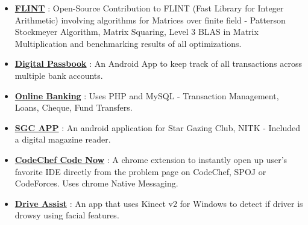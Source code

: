 \documentclass[margin, centered]{res}
\begin{document}
\begin{resume}
\begin{itemize}[leftmargin=*]
 \item \textbf{\href{https://github.com/ashish1294/flint2}{FLINT}} : Open-Source Contribution to FLINT (Fast Library for Integer Arithmetic) involving algorithms for Matrices over finite field - Patterson Stockmeyer Algorithm, Matrix Squaring, Level 3 BLAS in Matrix Multiplication and benchmarking results of all optimizations.
 \item \textbf{\href{https://github.com/ashish1294/DigitalPassbook}{Digital Passbook}} : An Android App to keep track of all transactions across multiple bank accounts.
 \item \textbf{\href{https://github.com/ashish1294/OnlineBankingPHP}{Online Banking}} : Uses PHP and MySQL - Transaction Management, Loans, Cheque, Fund Transfers.
 \item \textbf{\href{https://github.com/ashish1294/SGC-App}{SGC APP}} : An android application for Star Gazing Club, NITK - Included a digital magazine reader.
 \item \textbf{\href{https://github.com/ashish1294/code-now-CodeChef}{CodeChef Code Now}} : A chrome extension to instantly open up user's favorite IDE directly from the problem page on CodeChef, SPOJ or CodeForces. Uses chrome Native Messaging.
 \item \textbf{\href{}{Drive Assist}} : An app that uses Kinect v2 for Windows to detect if driver is drowsy using facial features.
\end{itemize}



\end{resume}
\end{document}
